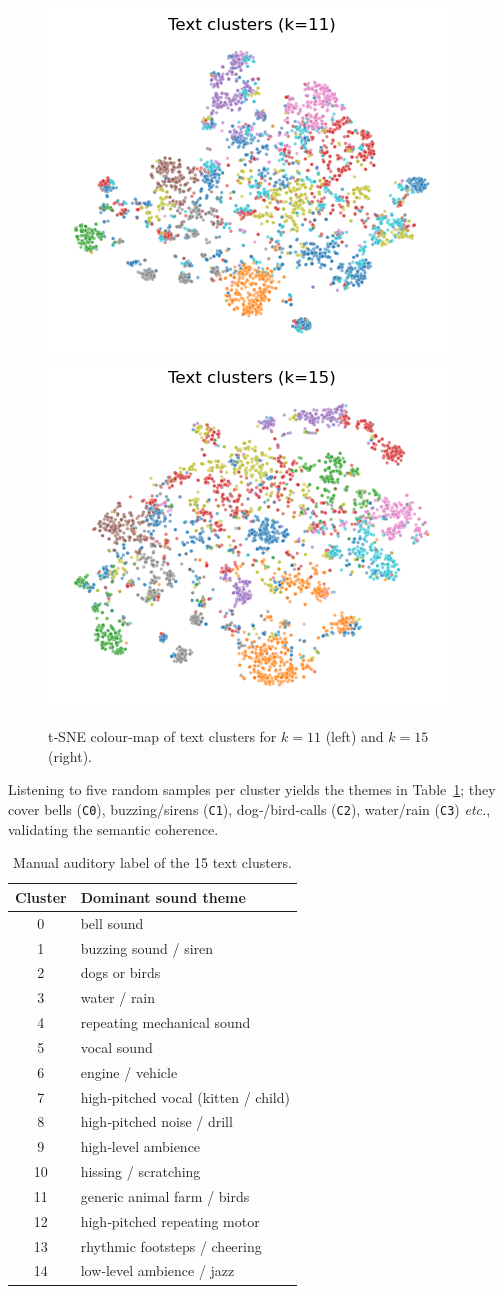 \documentclass{article}
\begin{document}
\begin{figure}[h]
  \centering
  \includegraphics[width=.45\linewidth]{figs_tang/04_text_cluster11.png}\hfill
  \includegraphics[width=.45\linewidth]{figs_tang/04_text_cluster15.png}
  \caption{t‑SNE colour‑map of text clusters for $k=11$ (left) and $k=15$ (right).}
  \label{fig:text_tsne}
\end{figure}

Listening to five random samples per cluster yields the themes in
Table~\ref{tab:text_themes}; they cover bells (\texttt{C0}), buzzing/sirens
(\texttt{C1}), dog‑/bird‑calls (\texttt{C2}), water/rain (\texttt{C3}) \emph{etc.},
validating the semantic coherence.

\begin{table}[h]
  \caption{Manual auditory label of the 15 text clusters.}
  \label{tab:text_themes}
  \centering
  \small
  \begin{tabular}{cl}
    \toprule
    Cluster & Dominant sound theme \\ \midrule
    0 & bell sound \\
    1 & buzzing sound / siren \\
    2 & dogs or birds \\
    3 & water / rain \\
    4 & repeating mechanical sound \\
    5 & vocal sound \\
    6 & engine / vehicle \\
    7 & high‑pitched vocal (kitten / child) \\
    8 & high‑pitched noise / drill \\
    9 & high‑level ambience \\
    10 & hissing / scratching \\
    11 & generic animal farm / birds \\
    12 & high‑pitched repeating motor \\
    13 & rhythmic footsteps / cheering \\
    14 & low‑level ambience / jazz \\
    \bottomrule
  \end{tabular}
\end{table}
\end{document}
